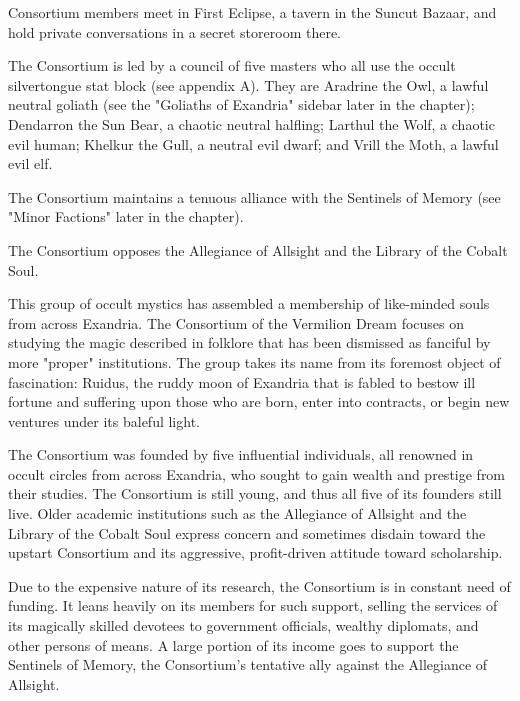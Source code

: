 \documentclass[10pt,a4paper,twoside,bg=print,twocolumn,openany,nodeprecatedcode]{dndbook}
\begin{document}
\begin{description}[nolistsep]
\item[Headquarters.]
Consortium members meet in First Eclipse, a tavern in the Suncut Bazaar, and hold private conversations in a secret storeroom there.
\item[Leader.]
The Consortium is led by a council of five masters who all use the occult silvertongue stat block (see appendix A). They are Aradrine the Owl, a lawful neutral goliath (see the "Goliaths of Exandria" sidebar later in the chapter); Dendarron the Sun Bear, a chaotic neutral halfling; Larthul the Wolf, a chaotic evil human; Khelkur the Gull, a neutral evil dwarf; and Vrill the Moth, a lawful evil elf.
\item[Allies.]
The Consortium maintains a tenuous alliance with the Sentinels of Memory (see "Minor Factions" later in the chapter).
\item[Opponents.]
The Consortium opposes the Allegiance of Allsight and the Library of the Cobalt Soul.
\end{description}

This group of occult mystics has assembled a membership of like-minded souls from across Exandria. The Consortium of the Vermilion Dream focuses on studying the magic described in folklore that has been dismissed as fanciful by more "proper" institutions. The group takes its name from its foremost object of fascination: Ruidus, the ruddy moon of Exandria that is fabled to bestow ill fortune and suffering upon those who are born, enter into contracts, or begin new ventures under its baleful light.

The Consortium was founded by five influential individuals, all renowned in occult circles from across Exandria, who sought to gain wealth and prestige from their studies. The Consortium is still young, and thus all five of its founders still live. Older academic institutions such as the Allegiance of Allsight and the Library of the Cobalt Soul express concern and sometimes disdain toward the upstart Consortium and its aggressive, profit-driven attitude toward scholarship.

Due to the expensive nature of its research, the Consortium is in constant need of funding. It leans heavily on its members for such support, selling the services of its magically skilled devotees to government officials, wealthy diplomats, and other persons of means. A large portion of its income goes to support the Sentinels of Memory, the Consortium's tentative ally against the Allegiance of Allsight.
\end{document}
